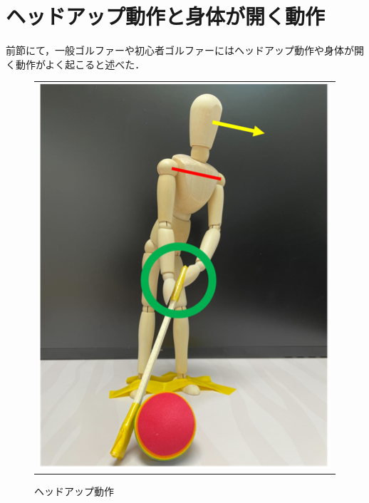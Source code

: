 \section{ヘッドアップ動作と身体が開く動作}
前節にて，一般ゴルファーや初心者ゴルファーにはヘッドアップ動作や身体が開く動作がよく起こると述べた．

\begin{figure}
    \begin{center}
        \begin{tabular}{c}
            \begin{minipage}{0.5\hsize}
                \begin{center}
                    \includegraphics{./images/headup.png}
                    \caption{ヘッドアップ動作}
                    \label{headup}
                \end{center}
            \end{minipage}


\end{tabular}
\end{center}
\end{figure}
